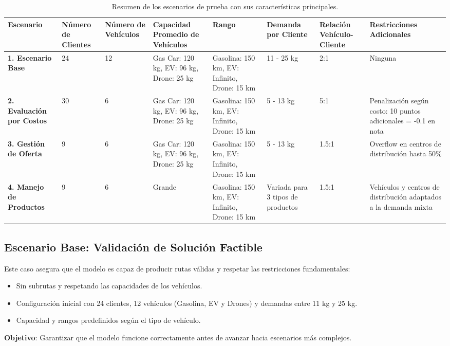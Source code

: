 \documentclass[12pt]{article}
\begin{document}
\begin{table}[h!]
\centering
\begin{adjustbox}{max width=\textwidth}
  \begin{tabular}{|l|p{2cm}|p{2cm}|p{2cm}|p{2cm}|p{1.5cm}|p{2cm}|p{3cm}|}
\hline
\textbf{Escenario} & \textbf{Número de Clientes} & \textbf{Número de Vehículos} & \textbf{Capacidad Promedio de Vehículos} & \textbf{Rango} & \textbf{Demanda por Cliente} & \textbf{Relación Vehículo-Cliente} & \textbf{Restricciones Adicionales} \\ \hline
\textbf{1. Escenario Base} & 24 & 12 & Gas Car: 120 kg, EV: 96 kg, Drone: 25 kg & Gasolina: 150 km, EV: Infinito, Drone: 15 km & 11 - 25 kg & 2:1 & Ninguna \\ \hline
\textbf{2. Evaluación por Costos} & 30 & 6 & Gas Car: 120 kg, EV: 96 kg, Drone: 25 kg & Gasolina: 150 km, EV: Infinito, Drone: 15 km & 5 - 13 kg & 5:1 & Penalización según costo: 10 puntos adicionales = -0.1 en nota \\ \hline
\textbf{3. Gestión de Oferta} & 9 & 6 & Gas Car: 120 kg, EV: 96 kg, Drone: 25 kg & Gasolina: 150 km, EV: Infinito, Drone: 15 km & 5 - 13 kg & 1.5:1 & Overflow en centros de distribución hasta 50\% \\ \hline
\textbf{4. Manejo de Productos} & 9 & 6 & Grande & Gasolina: 150 km, EV: Infinito, Drone: 15 km & Variada para 3 tipos de productos & 1.5:1 & Vehículos y centros de distribución adaptados a la demanda mixta \\ \hline
\end{tabular}
\end{adjustbox}
\caption{Resumen de los escenarios de prueba con sus características principales.}
\label{table:escenarios}
\end{table}

\subsection{Escenario Base: Validación de Solución Factible}
Este caso asegura que el modelo es capaz de producir rutas válidas y respetar las restricciones fundamentales:
\begin{itemize}
    \item Sin subrutas y respetando las capacidades de los vehículos.
    \item Configuración inicial con 24 clientes, 12 vehículos (Gasolina, EV y Drones) y demandas entre 11 kg y 25 kg.
    \item Capacidad y rangos predefinidos según el tipo de vehículo.
\end{itemize}
\textbf{Objetivo}: Garantizar que el modelo funcione correctamente antes de avanzar hacia escenarios más complejos.
\end{document}
